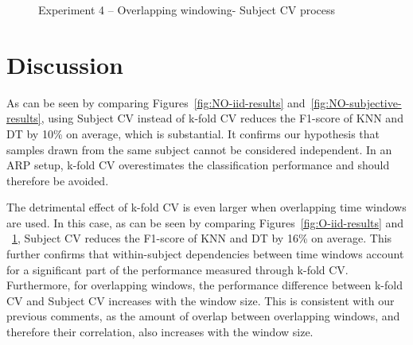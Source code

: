 \documentclass[sigconf]{acmart}
\begin{document}
\begin{figure}[htp]
   
   \caption{Experiment 4 -- Overlapping windowing- Subject CV process}
    \label{fig:O-subjective-results}

\end{figure}

\section{Discussion} \label{sec:discussion}

As can be seen by comparing Figures~\ref{fig:NO-iid-results} and~\ref{fig:NO-subjective-results}, using Subject CV instead of 
k-fold CV reduces the F1-score of KNN and DT by 10\% on average, which is substantial. It confirms our hypothesis that samples drawn from the 
same subject cannot be considered independent. In an ARP setup, k-fold CV overestimates the classification performance and should therefore be avoided.
   
The detrimental effect of k-fold CV is even larger when overlapping time windows are used. In this case, as can be seen by comparing Figures~\ref{fig:O-iid-results} and 
~\ref{fig:O-subjective-results}, Subject CV reduces the F1-score of KNN and DT by 16\% on average. This 
further confirms that within-subject dependencies between time windows account for a significant part of the performance measured through 
k-fold CV. Furthermore, for overlapping windows, the performance 
difference between k-fold CV and Subject CV increases with the window 
size. This is consistent with our previous comments, as the amount of 
overlap between overlapping windows, and therefore their correlation, 
also increases with the window size.
\end{document}
